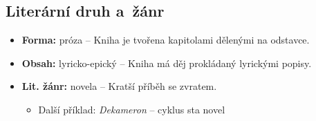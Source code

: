 \subsection{Literární druh a~žánr}
\begin{itemize}
    \item \textbf{Forma:} próza -- Kniha je tvořena kapitolami dělenými na odstavce.
    \item \textbf{Obsah:} lyricko-epický -- Kniha má děj prokládaný lyrickými popisy.
    \item \textbf{Lit. žánr:} novela -- Kratší příběh se zvratem.
    \begin{itemize}
        \item Další příklad: \textit{Dekameron} -- cyklus sta novel
    \end{itemize}
\end{itemize}

\newpage
